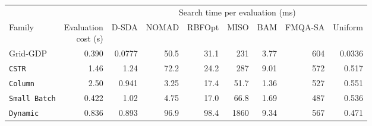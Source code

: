 \begin{tabular}{lrrrrrrrr}\toprule
 & & \multicolumn{7}{c}{Search time per evaluation (ms)}\\\cmidrule(l){3-9}
Family & \makecell{Evaluation\\cost (s)} & D-SDA & NOMAD & RBFOpt & MISO & BAM & FMQA-SA & Uniform\\\midrule
Grid-GDP & 0.390 & 0.0777 & 50.5 & 31.1 & 231 & 3.77 & 604 & 0.0336 \\
\texttt{CSTR} & 1.46 & 1.24 & 72.2 & 24.2 & 287 & 9.01 & 572 & 0.517 \\
\texttt{Column} & 2.50 & 0.941 & 3.25 & 17.4 & 51.7 & 1.36 & 527 & 0.551 \\
\texttt{Small Batch} & 0.422 & 1.02 & 4.75 & 17.0 & 66.8 & 1.69 & 487 & 0.536 \\
\texttt{Dynamic} & 0.836 & 0.893 & 96.9 & 98.4 & 1860 & 9.34 & 567 & 0.471 \\
\bottomrule\end{tabular}
